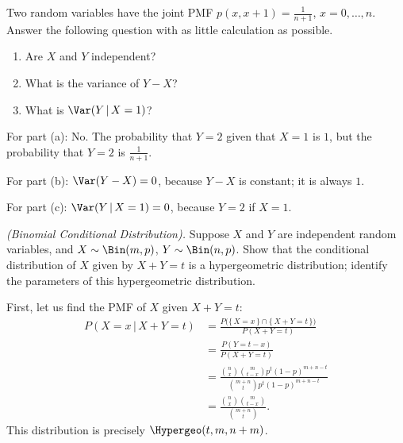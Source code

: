 \begin{problem}[Handout 15, \# 13]
  Two random variables have the joint PMF \(p(x,x+1)=\frac{1}{n+1}\),
  \(x=0,\dotsc,n\). Answer the following question with as little
  calculation as possible.
  \begin{enumerate}[label=(\alph*),noitemsep]
  \item Are \(X\) and \(Y\) independent?
  \item What is the variance of \(Y-X\)?
  \item What is \(\Var(Y\,|\,{X=1})\)?
  \end{enumerate}
\end{problem}
\begin{solution}
  For part (a): No. The probability that $Y=2$ given that $X=1$ is $1$, but
  the probability that $Y=2$ is $\frac{1}{n+1}$.

  For part (b): $\Var(Y-X) = 0$, because $Y-X$ is constant; it is
  always $1$.

  For part (c): $\Var(Y\,|\,X=1) = 0$, because $Y = 2$ if $X=1$.
\end{solution}
\newpage

\begin{problem}[Handout 15, \# 14]
  \emph{(Binomial Conditional Distribution).} Suppose \(X\) and \(Y\) are
  independent random variables, and \(X\sim\Bin(m,p)\),
  \(Y\sim\Bin(n,p)\). Show that the conditional distribution of \(X\) given
  by \(X+Y=t\) is a hypergeometric distribution; identify the parameters of
  this hypergeometric distribution.
\end{problem}
\begin{solution}
  First, let us find the PMF of \(X\) given \(X+Y=t\):
  \begin{align*}
    P(X=x\,|\,X+Y=t)
    &=\frac{P\bigl(\{\,X=x\,\}\cap\{\,X+Y=t\,\}\bigr)}{P(X+Y=t)}\\
    &=\frac{P(Y=t-x)}{P(X+Y=t)}\\
    &=\frac{\binom{n}{x}\binom{m}{t-x}p^t(1-p)^{m+n-t}}
      {\binom{m+n}{t}p^t(1-p)^{m+n-t}}\\
    &=\frac{\binom{n}{x}\binom{m}{t-x}}{\binom{m+n}{t}}.
  \end{align*}
  This distribution is precisely \(\Hypergeo(t,m,n+m)\).
\end{solution}
\newpage

